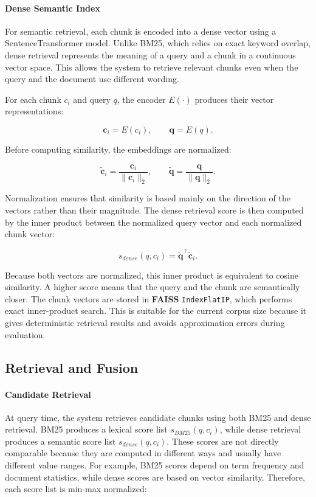 \documentclass[11pt,a4paper]{article}
\begin{document}
\paragraph{Dense Semantic Index}

For semantic retrieval, each chunk is encoded into a dense vector using a SentenceTransformer model. Unlike BM25, which relies on exact keyword overlap, dense retrieval represents the meaning of a query and a chunk in a continuous vector space. This allows the system to retrieve relevant chunks even when the query and the document use different wording.

For each chunk $c_i$ and query $q$, the encoder $E(\cdot)$ produces their vector representations:

\[
\mathbf{c}_i = E(c_i), \qquad \mathbf{q} = E(q).
\]

Before computing similarity, the embeddings are normalized:

\[
\tilde{\mathbf{c}}_i =
\frac{\mathbf{c}_i}{\|\mathbf{c}_i\|_2},
\qquad
\tilde{\mathbf{q}} =
\frac{\mathbf{q}}{\|\mathbf{q}\|_2}.
\]

Normalization ensures that similarity is based mainly on the direction of the vectors rather than their magnitude. The dense retrieval score is then computed by the inner product between the normalized query vector and each normalized chunk vector:

\[
s_{dense}(q,c_i) =
\tilde{\mathbf{q}}^{\top}\tilde{\mathbf{c}}_i.
\]

Because both vectors are normalized, this inner product is equivalent to cosine similarity. A higher score means that the query and the chunk are semantically closer. The chunk vectors are stored in \textbf{FAISS} \texttt{IndexFlatIP}, which performs exact inner-product search. This is suitable for the current corpus size because it gives deterministic retrieval results and avoids approximation errors during evaluation.

\subsection{Retrieval and Fusion}

\paragraph{Candidate Retrieval}

At query time, the system retrieves candidate chunks using both BM25 and dense
retrieval. BM25 produces a lexical score list $s_{BM25}(q,c_i)$, while dense
retrieval produces a semantic score list $s_{dense}(q,c_i)$. These scores are
not directly comparable because they are computed in different ways and usually
have different value ranges. For example, BM25 scores depend on term frequency
and document statistics, while dense scores are based on vector similarity.
Therefore, each score list is min-max normalized:
\end{document}
